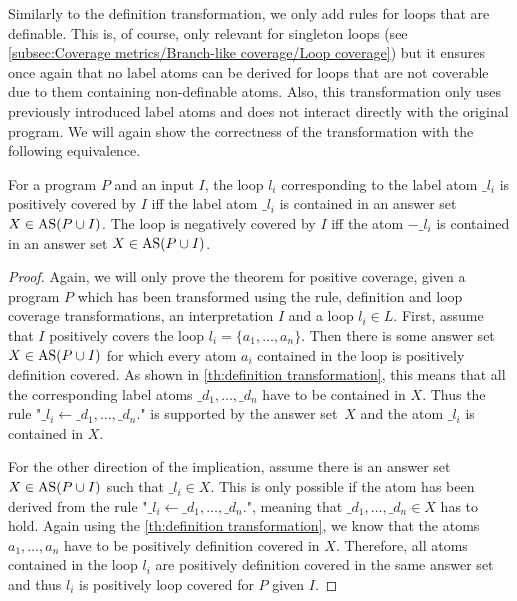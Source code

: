 Similarly to the definition transformation, we only add rules for loops that are definable. This is, of course, only relevant for singleton loops (see \cref{subsec:Coverage metrics/Branch-like coverage/Loop coverage}) but it ensures once again that no label atoms can be derived for loops that are not coverable due to them containing non-definable atoms.
Also, this transformation only uses previously introduced label atoms and does not interact directly with the original program. We will again show the correctness of the transformation with the following equivalence.

\begin{theorem}
\label{th:loop transformation}
    For a program $P$ and an input $I$, the loop $l_i$ corresponding to the label atom $\_l_i$ is positively covered by $I$ iff the label atom $\_l_i$ is contained in an answer set \(X \in \operatorname{AS}(P \cup I)\). The loop is negatively covered by $I$ iff the atom $-\_l_i$ is contained in an answer set \(X \in \operatorname{AS}(P \cup I)\).
\end{theorem}

\begin{proof}
\label{pr:loop transformation}
    Again, we will only prove the theorem for positive coverage, given a program $P$ which has been transformed using the rule, definition and loop coverage transformations, an interpretation $I$ and a loop \(l_i \in L\). First, assume that $I$ positively covers the loop \(l_i = \{a_1, \ldots, a_n\}\). Then there is some answer set \(X \in \operatorname{AS}(P \cup I)\) for which every atom $a_i$ contained in the loop is positively definition covered. As shown in \cref{th:definition transformation}, this means that all the corresponding label atoms \(\_d_1, \ldots, \_d_n\) have to be contained in $X$. Thus the rule "\(\_l_i \leftarrow \_d_1, \ldots, \_d_n.\)" is supported by the answer set~$X$ and the atom $\_l_i$ is contained in $X$.

    For the other direction of the implication, assume there is an answer set \(X \in \operatorname{AS}(P \cup I)\) such that \(\_l_i \in X\). This is only possible if the atom has been derived from the rule "\(\_l_i \leftarrow \_d_1, \ldots, \_d_n.\)", meaning that \(\_d_1, \ldots, \_d_n \in X\) has to hold. Again using the \cref{th:definition transformation}, we know that the atoms \(a_1, \ldots, a_n\) have to be positively definition covered in $X$. Therefore, all atoms contained in the loop $l_i$ are positively definition covered in the same answer set and thus $l_i$ is positively loop covered for $P$ given $I$.
\end{proof}

